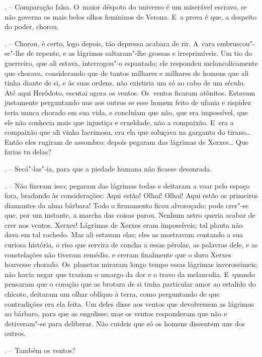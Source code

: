\begin{Parskip}
. -- Comparação falsa. O~maior déspota do universo é um miserável
escravo, se não governa os mais belos olhos femininos de Verona. E~a
prova é que, a despeito do poder, chorou.

. -- Chorou, é certo, logo depois, tão depressa acabara de
rir. A~cara embruscou"-se"-lhe de repente, e as lágrimas saltaram"-lhe
grossas e irreprimíveis. Um tio do guerreiro, que ali estava,
interrogou"-o espantado; ele respondeu melancolicamente que chorava,
considerando que de tantos milhares e milhares de homens que ali tinha
diante de si, e às suas ordens, não existiria um só ao cabo de um
século. Até aqui Heródoto, escutai agora os ventos. Os~ventos ficaram
atônitos. Estavam justamente perguntando uns aos outros se esse homem
feito de ufania e rispidez teria nunca chorado em sua vida, e concluíam
que não, que era impossível, que ele não conhecia mais que injustiça e
crueldade, não a compaixão. E~era a compaixão que ali vinha lacrimosa,
era ela que soluçava na garganta do tirano\ldots{} Então eles rugiram de
assombro; depois pegaram das lágrimas de Xerxes\ldots{} Que farias tu delas?

. -- Secá"-las"-ia, para que a piedade humana não ficasse desonrada.

. -- Não fizeram isso; pegaram das lágrimas todas e
deitaram a voar pelo espaço fora, bradando às considerações: Aqui estão!
Olhai! Olhai! Aqui estão os primeiros diamantes da alma bárbara! Todo o
firmamento ficou alvoroçado; pode crer"-se que, por um instante, a marcha
das coisas parou. Nenhum astro queria acabar de crer nos ventos. Xerxes!
Lágrimas de Xerxes eram impossíveis; tal planta não dava em tal rochedo.
Mas ali estavam elas; eles as mostravam contando a sua curiosa história,
o riso que servira de concha a essas pérolas, as palavras dele, e as
constelações não tiveram remédio, e creram finalmente que o duro Xerxes
houvesse chorado. Os~planetas miraram longo tempo essas lágrimas
inverossímeis; não havia negar que traziam o amargo da dor e o travo da
melancolia. E~quando pensaram que o coração que as brotara de si tinha
particular amor ao estalido do chicote, deitaram um olhar oblíquo à
terra, como perguntando de que contradições era ela feita. Um deles
disse aos ventos que devolvessem as lágrimas ao bárbaro, para que as
engolisse; mas os ventos responderam que não e detiveram"-se para
deliberar. Não cuideis que só os homens dissentem uns dos outros.

. -- Também os ventos?


\end{Parskip}
